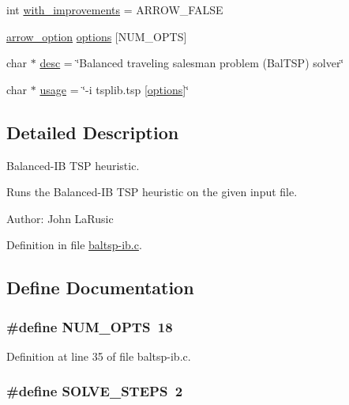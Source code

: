 \begin{CompactItemize}
\item 
int \hyperlink{bin_2baltsp-ib_8c_91079460b00ac08193d5ee47094f8f70}{with\_\-improvements} = ARROW\_\-FALSE
\item 
\hyperlink{structarrow__option}{arrow\_\-option} \hyperlink{bin_2baltsp-ib_8c_cea6a9709d519c143f30db401a0d0c72}{options} \mbox{[}NUM\_\-OPTS\mbox{]}
\item 
char $\ast$ \hyperlink{bin_2baltsp-ib_8c_3aad16fd4bea1b9717f232ea75ad6449}{desc} = \char`\"{}Balanced traveling salesman problem (BalTSP) solver\char`\"{}
\item 
char $\ast$ \hyperlink{bin_2baltsp-ib_8c_adebe2487a2c5240ab6cd02c83add0bf}{usage} = \char`\"{}-i tsplib.tsp \mbox{[}\hyperlink{tourinfo_8c_cea6a9709d519c143f30db401a0d0c72}{options}\mbox{]}\char`\"{}
\end{CompactItemize}


\subsection{Detailed Description}
Balanced-IB TSP heuristic. 

Runs the Balanced-IB TSP heuristic on the given input file.

\begin{Desc}
\item[Author:]John LaRusic \end{Desc}


Definition in file \hyperlink{bin_2baltsp-ib_8c-source}{baltsp-ib.c}.

\subsection{Define Documentation}
\hypertarget{bin_2baltsp-ib_8c_9b58b2c4af931c8486a986c9deca40f5}{
\subsubsection[{NUM\_\-OPTS}]{\setlength{\rightskip}{0pt plus 5cm}\#define NUM\_\-OPTS~18}}
\label{bin_2baltsp-ib_8c_9b58b2c4af931c8486a986c9deca40f5}




Definition at line 35 of file baltsp-ib.c.\hypertarget{bin_2baltsp-ib_8c_ceebcce8f411269df7b99e78247d7497}{
\subsubsection[{SOLVE\_\-STEPS}]{\setlength{\rightskip}{0pt plus 5cm}\#define SOLVE\_\-STEPS~2}}
\label{bin_2baltsp-ib_8c_ceebcce8f411269df7b99e78247d7497}




